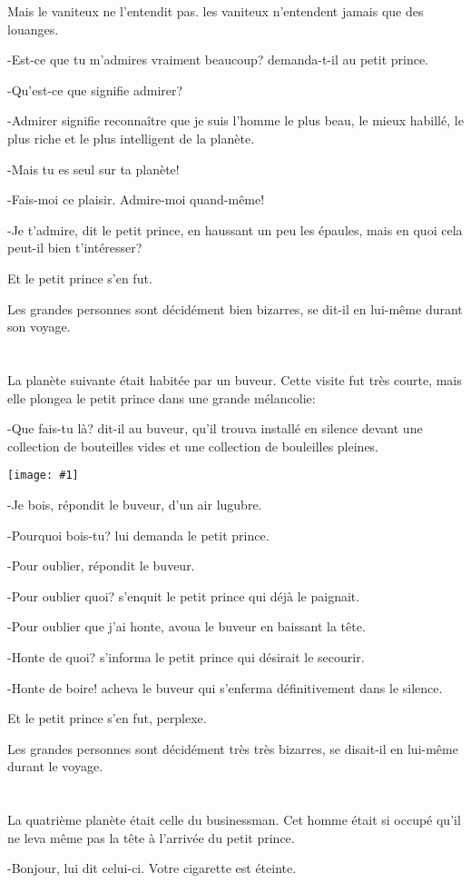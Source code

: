 \documentclass{report}
\newcommand{\parachapter}[2][]{\chapter[#1]{#2}}
\newcommand{\incpic}[1]{%
\begin{center}
    \texttt{[image: \#1]}
\end{center}%
}
\begin{document}
Mais le vaniteux ne l'entendit pas. les vaniteux n'entendent jamais que des louanges.

-Est-ce que tu m'admires vraiment beaucoup? demanda-t-il au petit prince.

-Qu'est-ce que signifie admirer?

-Admirer signifie reconnaître que je suis l'homme le plus beau, le mieux habillé, le plus riche et le plus intelligent de la planète.

-Mais tu es seul sur ta planète!

-Fais-moi ce plaisir. Admire-moi quand-même!

-Je t'admire, dit le petit prince, en haussant un peu les épaules, mais en quoi cela peut-il bien t'intéresser?

Et le petit prince s'en fut.

Les grandes personnes sont décidément bien bizarres, se dit-il en lui-même durant son voyage.

\parachapter{} %
La planète suivante était habitée par un buveur. Cette visite fut très courte, mais elle plongea le petit prince dans une grande mélancolie:

-Que fais-tu là? dit-il au buveur, qu'il trouva installé en silence devant une collection de bouteilles vides et une collection de bouleilles pleines.

\incpic{pic/image27.jpeg}

-Je bois, répondit le buveur, d'un air lugubre.

-Pourquoi bois-tu? lui demanda le petit prince.

-Pour oublier, répondit le buveur.

-Pour oublier quoi? s'enquit le petit prince qui déjà le paignait.

-Pour oublier que j'ai honte, avoua le buveur en baissant la tête.

-Honte de quoi? s'informa le petit prince qui désirait le secourir.

-Honte de boire! acheva le buveur qui s'enferma définitivement dans le silence.

Et le petit prince s'en fut, perplexe.

Les grandes personnes sont décidément très très bizarres, se disait-il en lui-même durant le voyage.
\parachapter{} %
La quatrième planète était celle du businessman. Cet homme était si occupé qu'il ne leva même pas la tête à l'arrivée du petit prince.

-Bonjour, lui dit celui-ci. Votre cigarette est éteinte.
\end{document}
